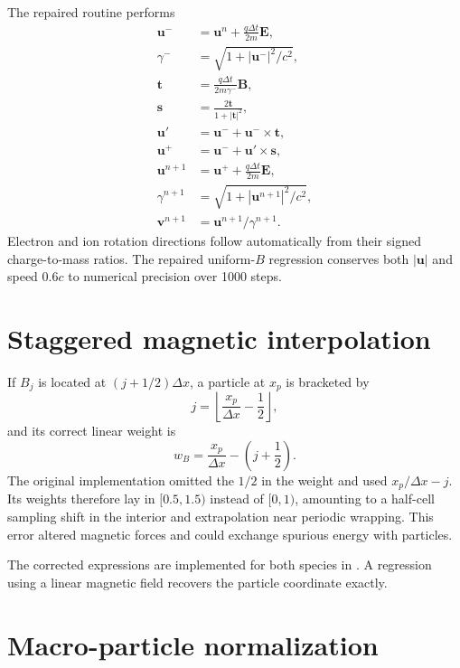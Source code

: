 \documentclass[11pt,a4paper]{article}
\begin{document}
The repaired routine performs
\begin{align}
  \mathbf{u}^{-} &= \mathbf{u}^{n}
       +\frac{q\Delta t}{2m}\mathbf{E},\\
  \gamma^- &= \sqrt{1+|\mathbf{u}^{-}|^2/c^2},\\
  \mathbf{t} &= \frac{q\Delta t}{2m\gamma^-}\mathbf{B},\\
  \mathbf{s} &= \frac{2\mathbf{t}}{1+|\mathbf{t}|^2},\\
  \mathbf{u}' &= \mathbf{u}^{-}+\mathbf{u}^{-}\times\mathbf{t},\\
  \mathbf{u}^{+} &= \mathbf{u}^{-}+\mathbf{u}'\times\mathbf{s},\\
  \mathbf{u}^{n+1} &= \mathbf{u}^{+}
       +\frac{q\Delta t}{2m}\mathbf{E},\\
  \gamma^{n+1} &= \sqrt{1+|\mathbf{u}^{n+1}|^2/c^2},\\
  \mathbf{v}^{n+1} &= \mathbf{u}^{n+1}/\gamma^{n+1}.
\end{align}
Electron and ion rotation directions follow automatically from their signed
charge-to-mass ratios.  The repaired uniform-$B$ regression conserves both
$|\mathbf{u}|$ and speed $0.6c$ to numerical precision over 1000 steps.

\section{Staggered magnetic interpolation}

If $B_j$ is located at $(j+1/2)\Delta x$, a particle at $x_p$ is bracketed by
\begin{equation}
  j=\left\lfloor\frac{x_p}{\Delta x}-\frac12\right\rfloor,
\end{equation}
and its correct linear weight is
\begin{equation}
  w_B=\frac{x_p}{\Delta x}-\left(j+\frac12\right).
\end{equation}
The original implementation omitted the $1/2$ in the weight and used
$x_p/\Delta x-j$.  Its weights therefore lay in $[0.5,1.5)$ instead of
$[0,1)$, amounting to a half-cell sampling shift in the interior and
extrapolation near periodic wrapping.  This error altered magnetic forces and
could exchange spurious energy with particles.

The corrected expressions are implemented for both species in
.  A regression using a linear magnetic field recovers the
particle coordinate exactly.

\section{Macro-particle normalization}
\end{document}

